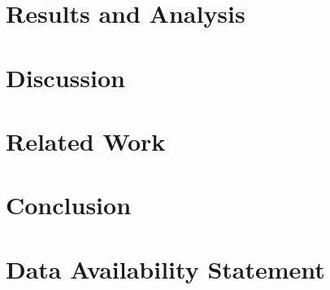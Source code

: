 \documentclass[10pt,conference]{IEEEtran}
\begin{document}
\section{Results and Analysis}
\label{sec:results}


\section{Discussion}
\label{sec:discussion}



\section{Related Work}
\label{sec:relatedwork}


\section{Conclusion}
\label{sec:conclusion}


\section{Data Availability Statement}
\label{sec:dataAvailability}


\balance


\end{document}
